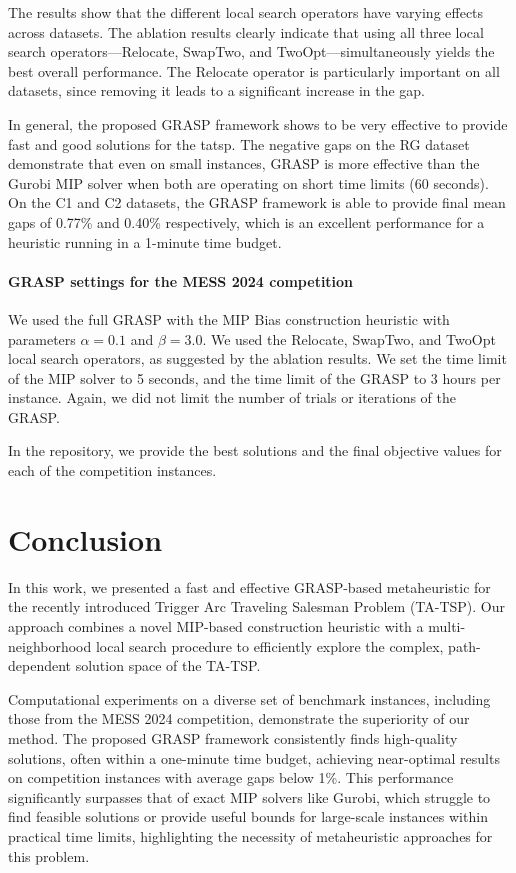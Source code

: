 \documentclass[twocolumn, switch]{article} %
\begin{document}
The results show that the different local search operators have varying effects across datasets.
The ablation results clearly indicate that using all three local search operators—Relocate, SwapTwo, and TwoOpt—simultaneously yields the best overall performance.
The Relocate operator is particularly important on all datasets, since removing it leads to a significant increase in the gap.

In general, the proposed GRASP framework shows to be very effective to provide fast and good solutions for the \gls{tatsp}.
The negative gaps on the RG dataset demonstrate that even on small instances, GRASP is more effective than the Gurobi MIP solver when both are operating on short time limits (60 seconds).
On the C1 and C2 datasets, the GRASP framework is able to provide final mean gaps of 0.77\% and 0.40\% respectively, which is an excellent performance for a heuristic running in a 1-minute time budget.

\paragraph{GRASP settings for the MESS 2024 competition}

We used the full GRASP with the MIP Bias construction heuristic with parameters $\alpha = 0.1$ and $\beta = 3.0$.
We used the Relocate, SwapTwo, and TwoOpt local search operators, as suggested by the ablation results.
We set the time limit of the MIP solver to 5 seconds, and the time limit of the GRASP to 3 hours per instance.
Again, we did not limit the number of trials or iterations of the GRASP.

In the repository, we provide the best solutions and the final objective values for each of the competition instances.


\section{Conclusion}
In this work, we presented a fast and effective GRASP-based metaheuristic for the recently introduced Trigger Arc Traveling Salesman Problem (TA-TSP).
Our approach combines a novel MIP-based construction heuristic with a multi-neighborhood local search procedure to efficiently explore the complex, path-dependent solution space of the TA-TSP.

Computational experiments on a diverse set of benchmark instances, including those from the MESS 2024 competition, demonstrate the superiority of our method. The proposed GRASP framework consistently finds high-quality solutions, often within a one-minute time budget, achieving near-optimal results on competition instances with average gaps below 1\%. This performance significantly surpasses that of exact MIP solvers like Gurobi, which struggle to find feasible solutions or provide useful bounds for large-scale instances within practical time limits, highlighting the necessity of metaheuristic approaches for this problem.
\end{document}
